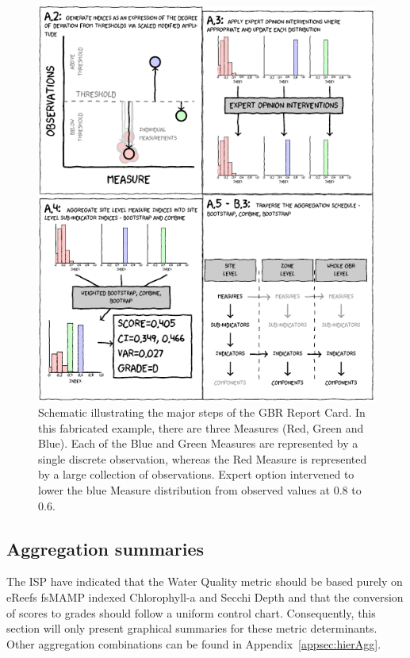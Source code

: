 \begin{figure}[h]
\includegraphics[width=\linewidth]{figures/Diagrams/schematic.pdf}
\caption{Schematic illustrating the major steps of the GBR Report Card. In this fabricated example,
there are three Measures (Red, Green and Blue).  Each of the Blue and Green Measures are represented by a single
discrete observation, whereas the Red Measure is represented by a large collection of observations.
Expert option intervened to lower the blue Measure distribution from observed values at 0.8 to 0.6.}\label{fig:schematic}
\end{figure}

\clearpage




\subsection{Aggregation summaries}

The ISP have indicated that the Water Quality metric should be based purely on eReefs fsMAMP indexed
Chlorophyll-a and Secchi Depth and that the conversion of scores to grades should follow a uniform
control chart.  Consequently, this section will only present graphical summaries for these metric
determinants.  Other aggregation combinations can be found in Appendix~\ref{appsec:hierAgg}.

